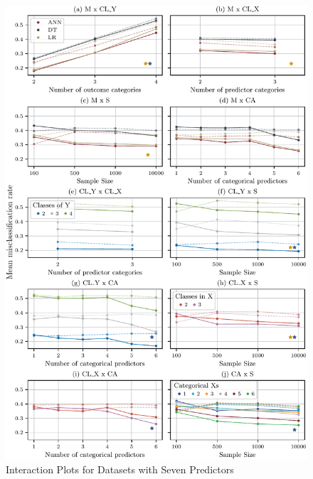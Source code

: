 \documentclass[12pt]{article}
\begin{document}
\begin{figure}[h]
    \centering
    \includegraphics{fig/16_20_Interactions_V7.pdf}
    \caption{Interaction Plots for Datasets with Seven Predictors}
    \label{fig:16_20_Interactions_V7}
\end{figure}

\end{document}
